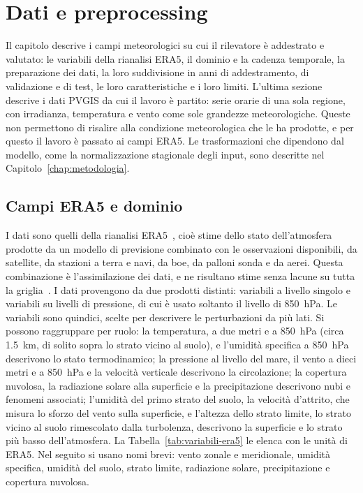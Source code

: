 \chapter{Dati e preprocessing}
\label{chap:dati}

Il capitolo descrive i campi meteorologici su cui il rilevatore è addestrato e valutato: le variabili della rianalisi ERA5, il dominio e la cadenza temporale, la preparazione dei dati, la loro suddivisione in anni di addestramento, di validazione e di test, le loro caratteristiche e i loro limiti. L'ultima sezione descrive i dati PVGIS da cui il lavoro è partito: serie orarie di una sola regione, con irradianza, temperatura e vento come sole grandezze meteorologiche. Queste non permettono di risalire alla condizione meteorologica che le ha prodotte, e per questo il lavoro è passato ai campi ERA5. Le trasformazioni che dipendono dal modello, come la normalizzazione stagionale degli input, sono descritte nel Capitolo~\ref{chap:metodologia}.

\section{Campi ERA5 e dominio}
\label{sec:dati-era5}

I dati sono quelli della rianalisi ERA5~\cite{hersbach2020era5}, cioè stime dello stato dell'atmosfera prodotte da un modello di previsione combinato con le osservazioni disponibili, da satellite, da stazioni a terra e navi, da boe, da palloni sonda e da aerei. Questa combinazione è l'assimilazione dei dati, e ne risultano stime senza lacune su tutta la griglia~\cite{hersbach2020era5}. I dati provengono da due prodotti distinti: variabili a livello singolo e variabili su livelli di pressione, di cui è usato soltanto il livello di 850~hPa. Le variabili sono quindici, scelte per descrivere le perturbazioni da più lati. Si possono raggruppare per ruolo: la temperatura, a due metri e a 850~hPa (circa 1.5~km, di solito sopra lo strato vicino al suolo), e l'umidità specifica a 850~hPa descrivono lo stato termodinamico; la pressione al livello del mare, il vento a dieci metri e a 850~hPa e la velocità verticale descrivono la circolazione; la copertura nuvolosa, la radiazione solare alla superficie e la precipitazione descrivono nubi e fenomeni associati; l'umidità del primo strato del suolo, la velocità d'attrito, che misura lo sforzo del vento sulla superficie, e l'altezza dello strato limite, lo strato vicino al suolo rimescolato dalla turbolenza, descrivono la superficie e lo strato più basso dell'atmosfera. La Tabella~\ref{tab:variabili-era5} le elenca con le unità di ERA5. Nel seguito si usano nomi brevi: vento zonale e meridionale, umidità specifica, umidità del suolo, strato limite, radiazione solare, precipitazione e copertura nuvolosa.

